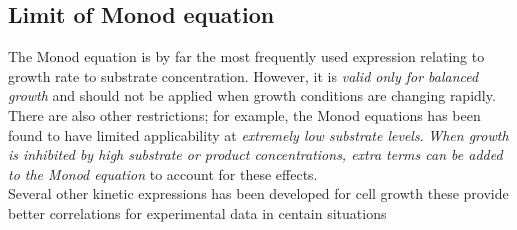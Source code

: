 \documentclass["EB-Notebook.tex"]{subfiles}
\begin{document}
\begin{sectionBox}
\begin{center}
\begin{tabular}{>{\itshape}l l S}
      \\\bottomrule
    \end{tabular}
    \vspace{2ex}
  \end{center}


  \subsection*{Limit of Monod equation}
  The Monod equation is by far the most frequently used expression relating to growth rate to substrate concentration. However, it is \emph{valid only for balanced growth} and should not be applied when growth conditions are changing rapidly. There are also other restrictions; for example, the Monod equations has been found to have limited applicability at \emph{extremely low substrate levels}. \emph{When growth is inhibited by high substrate or product concentrations, extra terms can be added to the Monod equation} to account for these effects.\\
  Several other kinetic expressions has been developed for cell growth these provide better correlations for experimental data in centain situations
\end{sectionBox}
\end{document}
